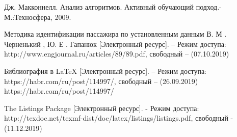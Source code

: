 \documentclass[a4paper, 14pt]{article}
\begin{document}
	\begin{thebibliography}{4}
		Дж. Макконнелл. Анализ алгоритмов. Активный обучающий подход.-
		М.:Техносфера, 2009.
		
		
		Методика идентификации пассажира по установленным данным В. М . Черненький , Ю. Е . Гапанюк [Электронный ресурс]. – Режим доступа: http://www.engjournal.ru/articles/89/89.pdf, свободный – (07.10.2019)
		
		Библиография в LaTeX [Электронный ресурс]. – Режим доступа: https://habr.com/ru/post/114997/, свободный – (26.09.2019)
		https://habr.com/ru/post/114997/
		
		The Listings Package [Электронный ресурс]. - Режим доступа: http://texdoc.net/texmf-dist/doc/latex/listings/listings.pdf, свободный - (11.12.2019)
		
	\end{thebibliography}
	
\end{document}
